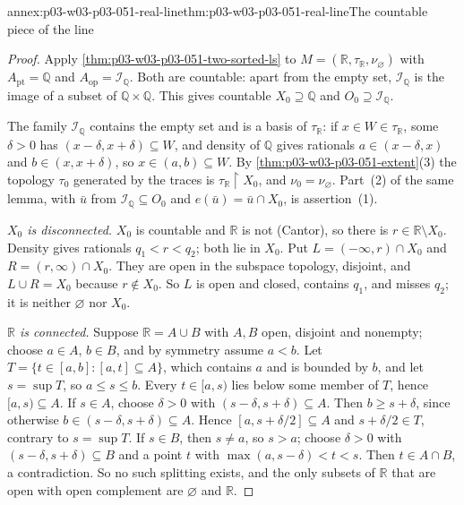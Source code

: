 \begin{annexitem}{annex:p03-w03-p03-051-real-line}{thm:p03-w03-p03-051-real-line}{The countable piece of the line}
\begin{proof}
Apply \cref{thm:p03-w03-p03-051-two-sorted-ls} to
\(M=(\mathbb R,\tau_{\mathbb R},\nu_\varnothing)\) with
\(A_{\mathrm{pt}}=\mathbb Q\) and \(A_{\mathrm{op}}=\mathcal I_{\mathbb Q}\).
Both are countable: apart from the empty set,
\(\mathcal I_{\mathbb Q}\) is the image of a subset of
\(\mathbb Q\times\mathbb Q\). This gives countable \(X_0\supseteq\mathbb Q\)
and \(O_0\supseteq\mathcal I_{\mathbb Q}\).

The family \(\mathcal I_{\mathbb Q}\) contains the empty set and is a
basis of \(\tau_{\mathbb R}\): if
\(x\in W\in\tau_{\mathbb R}\), some \(\delta>0\) has
\((x-\delta,x+\delta)\subseteq W\), and density of \(\mathbb Q\)
gives rationals \(a\in(x-\delta,x)\) and \(b\in(x,x+\delta)\), so
\(x\in(a,b)\subseteq W\). By \cref{thm:p03-w03-p03-051-extent}(3) the
topology \(\tau_0\) generated by the traces is
\(\tau_{\mathbb R}\restriction X_0\), and \(\nu_0=\nu_\varnothing\). Part~(2)
of the same lemma, with \(\bar u\) from
\(\mathcal I_{\mathbb Q}\subseteq O_0\) and \(e(\bar u)=\bar u\cap X_0\),
is assertion~(1).

\emph{\(X_0\) is disconnected.} \(X_0\) is countable and \(\mathbb R\) is
not (Cantor), so there is \(r\in\mathbb R\setminus X_0\). Density gives
rationals \(q_1<r<q_2\); both lie in \(X_0\). Put
\(L=(-\infty,r)\cap X_0\) and \(R=(r,\infty)\cap X_0\). They are open in
the subspace topology, disjoint, and \(L\cup R=X_0\) because \(r\notin X_0\).
So \(L\) is open and closed, contains \(q_1\), and misses \(q_2\); it is
neither \(\varnothing\) nor \(X_0\).

\emph{\(\mathbb R\) is connected.} Suppose \(\mathbb R=A\cup B\) with \(A,B\)
open, disjoint and nonempty; choose \(a\in A\), \(b\in B\), and by symmetry
assume \(a<b\). Let \(T=\{t\in[a,b]:[a,t]\subseteq A\}\), which contains
\(a\) and is bounded by \(b\), and let \(s=\sup T\), so \(a\le s\le b\).
Every \(t\in[a,s)\) lies below some member of \(T\), hence
\([a,s)\subseteq A\). If \(s\in A\), choose \(\delta>0\) with
\((s-\delta,s+\delta)\subseteq A\). Then \(b\ge s+\delta\),
since otherwise \(b\in(s-\delta,s+\delta)\subseteq A\). Hence
\([a,s+\delta/2]\subseteq A\) and \(s+\delta/2\in T\), contrary
to \(s=\sup T\). If \(s\in B\), then \(s\ne a\), so \(s>a\); choose
\(\delta>0\) with \((s-\delta,s+\delta)\subseteq B\) and a
point \(t\) with \(\max(a,s-\delta)<t<s\). Then \(t\in A\cap B\), a
contradiction. So no such splitting exists, and the only subsets of
\(\mathbb R\) that are open with open complement are \(\varnothing\) and
\(\mathbb R\).
\end{proof}
\end{annexitem}

